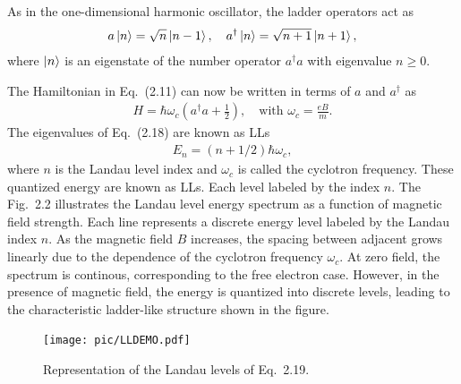 As in the one-dimensional harmonic oscillator, the ladder operators act as
\begin{equation}
	\begin{aligned}
		a \ket{n} = \sqrt{n} \ket{n-1}, \quad a^{\dagger} \ket{n} = \sqrt{n+1} \ket{n+1},
	\end{aligned}
\end{equation}
where $\ket{n}$ is an eigenstate of the number operator $a^{\dagger}a$ with eigenvalue $n \geq 0$.

The Hamiltonian in Eq.~(2.11) can now be written in terms of $a$ and $a^{\dagger}$ as
\begin{gather}
	H = \hbar \omega_c \left(a^{\dagger} a + \frac{1}{2}\right), \quad \text{with } \omega_c = \frac{eB}{m}.
\end{gather}
The eigenvalues of Eq.~(2.18) are known as \acp{LL}
\begin{gather}
	E_{n} = \left(n + 1/2\right) \hbar \omega_{c},
\end{gather}
where $n$ is the Landau level index and $\omega_{c}$ is called the cyclotron frequency. These quantized energy are known as \acp{LL}. Each level labeled by the index $n$. The Fig.~2.2 illustrates the Landau level energy spectrum as a function of magnetic field strength. Each line represents a discrete energy level labeled by the Landau index $n$. As the magnetic field $B$ increases, the spacing between adjacent grows linearly due to the dependence of the cyclotron frequency $\omega_{c}$. At zero field, the spectrum is continous, corresponding to the free electron case. However, in the presence of magnetic field, the energy is quantized into discrete levels, leading to the characteristic ladder-like structure shown in the figure.

\begin{figure}[H]
	\centering
	\texttt{[image: pic/LLDEMO.pdf]}
	\caption[Landau levels.]{Representation of the Landau levels of Eq.~2.19.}
\end{figure}



